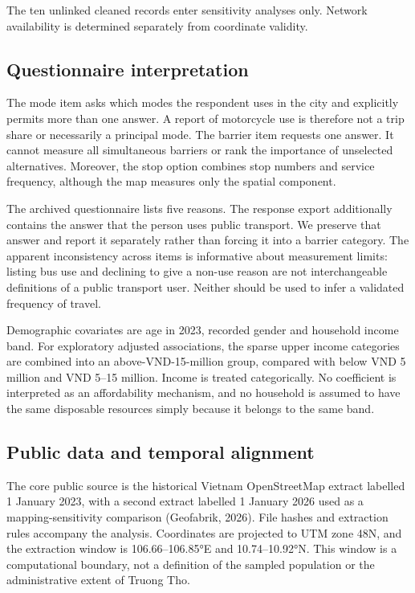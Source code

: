 \documentclass[
  11pt,
  a4paper,
]{article}
\begin{document}
The ten unlinked cleaned records enter sensitivity analyses only.
Network availability is determined separately from coordinate validity.

\subsection{Questionnaire
interpretation}\label{questionnaire-interpretation}

The mode item asks which modes the respondent uses in the city and
explicitly permits more than one answer. A report of motorcycle use is
therefore not a trip share or necessarily a principal mode. The barrier
item requests one answer. It cannot measure all simultaneous barriers or
rank the importance of unselected alternatives. Moreover, the stop
option combines stop numbers and service frequency, although the map
measures only the spatial component.

The archived questionnaire lists five reasons. The response export
additionally contains the answer that the person uses public transport.
We preserve that answer and report it separately rather than forcing it
into a barrier category. The apparent inconsistency across items is
informative about measurement limits: listing bus use and declining to
give a non-use reason are not interchangeable definitions of a public
transport user. Neither should be used to infer a validated frequency of
travel.

Demographic covariates are age in 2023, recorded gender and household
income band. For exploratory adjusted associations, the sparse upper
income categories are combined into an above-VND-15-million group,
compared with below VND 5 million and VND 5--15 million. Income is
treated categorically. No coefficient is interpreted as an affordability
mechanism, and no household is assumed to have the same disposable
resources simply because it belongs to the same band.

\subsection{Public data and temporal
alignment}\label{public-data-and-temporal-alignment}

The core public source is the historical Vietnam OpenStreetMap extract
labelled 1 January 2023, with a second extract labelled 1 January 2026
used as a mapping-sensitivity comparison (Geofabrik, 2026). File hashes
and extraction rules accompany the analysis. Coordinates are projected
to UTM zone 48N, and the extraction window is 106.66--106.85°E and
10.74--10.92°N. This window is a computational boundary, not a
definition of the sampled population or the administrative extent of
Truong Tho.
\end{document}
